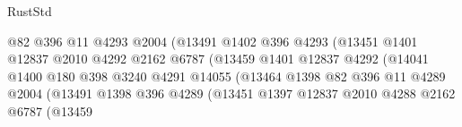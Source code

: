 \begin{lexlean}{RustStd}
\begin{coremodule}
                                            @82
                                            @396
                                            @11
                                            @4293
                                            @2004
                                            (@13491
                                              @1402
                                              @396
                                              @4293
                                              (@13451
                                                @1401
                                                @12837
                                                @2010
                                                @4292
                                                @2162
                                                @6787
                                                (@13459
                                                  @1401
                                                  @12837
                                                  @4292
                                                  (@14041
                                                    @1400
                                                    @180
                                                    @398
                                                    @3240
                                                    @4291
                                                    @14055
                                                    (@13464
                                                      @1398
                                                      @82
                                                      @396
                                                      @11
                                                      @4289
                                                      @2004
                                                      (@13491
                                                        @1398
                                                        @396
                                                        @4289
                                                        (@13451
                                                          @1397
                                                          @12837
                                                          @2010
                                                          @4288
                                                          @2162
                                                          @6787
                                                          (@13459

\end{coremodule}
\end{lexlean}
